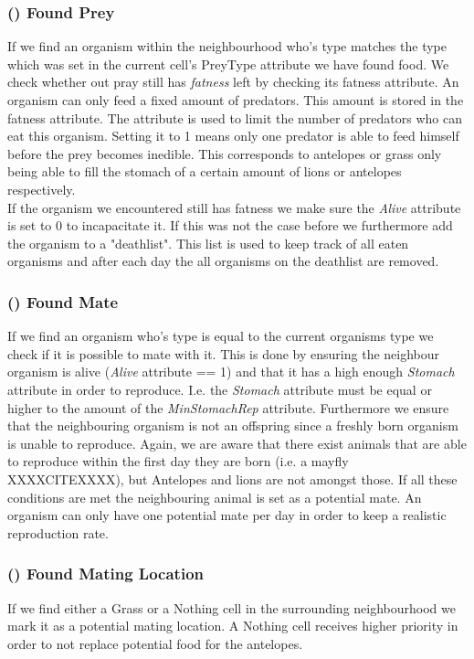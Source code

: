 \documentclass[11pt]{article}
\begin{document}
\addtocounter{protocolCounter}{1}
\subsubsection{() Found Prey}
If we find an organism within the neighbourhood who's type matches the type which was set in the current cell's PreyType attribute we have found food. We check whether out pray still has {\it fatness} left by checking its fatness attribute. An organism can only feed a fixed amount of predators. This amount is stored in the fatness attribute. The attribute is used to limit the number of predators who can eat this organism. Setting it to 1 means only one predator is able to feed himself before the prey becomes inedible. This corresponds to antelopes or grass only being able to fill the stomach of a certain amount of lions or antelopes respectively.\\

If the organism we encountered still has fatness we make sure the {\it Alive} attribute is set to 0 to incapacitate it. If this was not the case before we furthermore add the organism to a "deathlist". This list is used to keep track of all eaten organisms and after each day the all organisms on the deathlist are removed. 

\addtocounter{protocolCounter}{1}
\subsubsection{() Found Mate}
If we find an organism who's type is equal to the current organisms type we check if it is possible to mate with it. This is done by ensuring the neighbour organism is alive ({\it Alive} attribute == 1) and that it has a high enough {\it Stomach} attribute in order to reproduce. I.e. the {\it Stomach} attribute must be equal or higher to the amount of the {\it MinStomachRep} attribute. Furthermore we ensure that the neighbouring organism is not an offspring since a freshly born organism is unable to reproduce. Again, we are aware that there exist animals that are able to reproduce within the first day they are born (i.e. a mayfly XXXXCITEXXXX), but Antelopes and lions are not amongst those. If all these conditions are met the neighbouring animal is set as a potential mate. An organism can only have one potential mate per day in order to keep a realistic reproduction rate.

\addtocounter{protocolCounter}{1}
\subsubsection{() Found Mating Location}
If we find either a Grass or a Nothing cell in the surrounding neighbourhood we mark it as a potential mating location. A Nothing cell receives higher priority in order to not replace potential food for the antelopes. 
\end{document}
